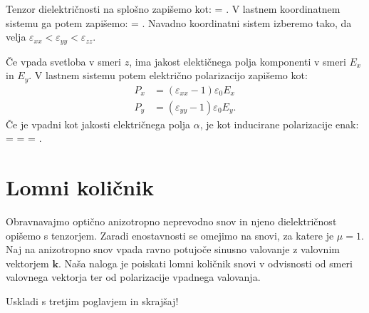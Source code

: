 Tenzor dielektričnosti na splošno zapišemo kot:
\beq
\underline{\varepsilon} = 
\!\!.
\eeq
V lastnem koordinatnem sistemu ga potem zapišemo:
\beq
\underline{\varepsilon} = 
\!\!.
\eeq
Navadno koordinatni sistem izberemo tako, da velja $\varepsilon_{xx}<\varepsilon_{yy}<\varepsilon_{zz}$. 

Če vpada svetloba v smeri $z$, ima jakost
elektičnega polja komponenti v smeri $E_x$ in $E_y$. 
V lastnem sistemu potem električno polarizacijo zapišemo kot:
\begin{align}
P_x &= (\varepsilon_{xx}-1) \varepsilon_0 E_x \\
P_y &= (\varepsilon_{yy}-1) \varepsilon_0 E_y.
\end{align}
Če je vpadni kot jakosti električnega polja $\alpha$, je kot
inducirane polarizacije enak:
\beq
\tan \beta =  = 
 = \tan \alpha.
\eeq

\section{Lomni količnik}
Obravnavajmo optično anizotropno neprevodno snov in njeno dielektričnost opišemo s tenzorjem. Zaradi
enostavnosti se omejimo na snovi, za katere je $\mu = 1$. Naj na anizotropno snov vpada
ravno potujoče sinusno valovanje z valovnim vektorjem $\mathbf{k}$. Naša naloga je poiskati
lomni količnik snovi v odvisnosti od smeri valovnega vektorja ter od polarizacije vpadnega
valovanja. 

Uskladi s tretjim poglavjem in skrajšaj!

